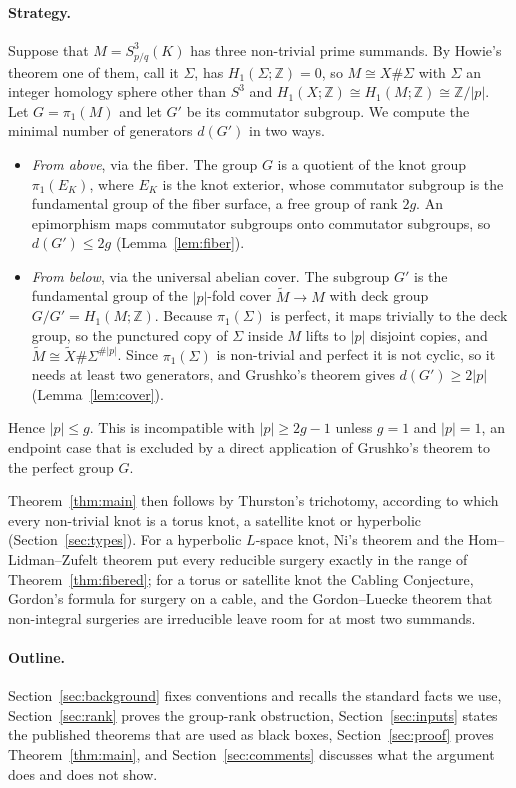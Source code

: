 \documentclass[12pt]{article}
\newcommand{\Z}{\mathbb Z}
\newcommand{\Surg}[2]{S^3_{#1}(#2)}
\newcommand{\rk}{d}
\theoremstyle{definition}
\theoremstyle{remark}
\begin{document}
\paragraph{Strategy.}
Suppose that \(M=\Surg{p/q}{K}\) has three non-trivial prime summands.
By Howie's theorem one of them, call it \(\Sigma\), has
\(H_1(\Sigma;\Z)=0\), so \(M\cong X\#\Sigma\) with \(\Sigma\) an integer
homology sphere other than \(S^3\) and \(H_1(X;\Z)\cong H_1(M;\Z)\cong\Z/|p|\).
Let \(G=\pi_1(M)\) and let \(G'\) be its commutator subgroup. We compute
the minimal number of generators \(\rk(G')\) in two ways.
\begin{itemize}
\item \emph{From above}, via the fiber. The group \(G\) is a quotient of
the knot group \(\pi_1(E_K)\), where \(E_K\) is the knot exterior, whose
commutator subgroup is the
fundamental group of the fiber surface, a free group of rank \(2g\). An
epimorphism maps commutator subgroups onto commutator subgroups, so
\(\rk(G')\leq 2g\) (Lemma~\ref{lem:fiber}).
\item \emph{From below}, via the universal abelian cover. The subgroup
\(G'\) is the fundamental group of the \(|p|\)-fold cover
\(\widetilde M\to M\) with deck group \(G/G'=H_1(M;\Z)\). Because
\(\pi_1(\Sigma)\) is perfect, it maps trivially to the deck group, so the
punctured copy of \(\Sigma\) inside \(M\) lifts to \(|p|\) disjoint copies,
and \(\widetilde M\cong\widetilde X\#\Sigma^{\#|p|}\). Since
\(\pi_1(\Sigma)\) is non-trivial and perfect it is not cyclic, so it needs
at least two generators, and Grushko's theorem gives
\(\rk(G')\geq 2|p|\) (Lemma~\ref{lem:cover}).
\end{itemize}
Hence \(|p|\leq g\). This is incompatible with \(|p|\geq 2g-1\) unless
\(g=1\) and \(|p|=1\), an endpoint case that is excluded by a direct
application of Grushko's theorem to the perfect group \(G\).

Theorem~\ref{thm:main} then follows by Thurston's trichotomy, according
to which every non-trivial knot is a torus knot, a satellite knot or
hyperbolic (Section~\ref{sec:types}). For a hyperbolic \(L\)-space knot, Ni's theorem and the Hom--Lidman--Zufelt
theorem put every reducible surgery exactly in the range of
Theorem~\ref{thm:fibered}; for a torus or satellite knot the Cabling
Conjecture, Gordon's formula for surgery on a cable, and the
Gordon--Luecke theorem that non-integral surgeries are irreducible leave
room for at most two summands.

\paragraph{Outline.}
Section~\ref{sec:background} fixes
conventions and recalls the standard facts we use,
Section~\ref{sec:rank} proves the group-rank obstruction,
Section~\ref{sec:inputs} states the published theorems that are used as
black boxes, Section~\ref{sec:proof} proves Theorem~\ref{thm:main}, and
Section~\ref{sec:comments} discusses what the argument does and does not
show.
\end{document}
